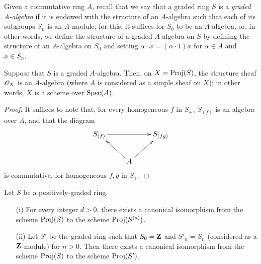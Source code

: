 \begin{env}[2.4.5]
\label{II.2.4.5}
Given a commutative ring $A$, recall that we say that a graded ring $S$ is a \emph{graded $A$-algebra} if it is endowed with the structure of an $A$-algebra such that each of its subgroups $S_n$ is an $A$-module;
for this, it suffices for $S_0$ to be
an $A$-algebra, or, in other words, we define the structure of a graded $A$-algebra on $S$ by defining the structure of an $A$-algebra on $S_0$ and setting $\alpha\cdot x=(\alpha\cdot1)x$ for $\alpha\in A$ and $x\in S_n$.
\end{env}

\begin{proposition}[2.4.6]
\label{II.2.4.6}
Suppose that $S$ is a graded $A$-algebra.
Then, on $X=\operatorname{Proj}(S)$, the structure sheaf $\mathscr{O}_X$ is an $A$-algebra (where $A$ is considered as a simple sheaf on $X$);
in other words, $X$ is a scheme over $\operatorname{Spec}(A)$.
\end{proposition}

\begin{proof}
It suffices to note that, for every homogeneous $f$ in $S_+$, $S_{(f)}$ is an algebra over $A$, and that the diagram
\[
  \xymatrix{
    S_{(f)} \ar[rr] && S_{(fg)}
  \\ & A \ar[ul] \ar[ur] &
  }
\]
is commutative, for homogeneous $f,g$ in $S_+$.
\end{proof}

\begin{proposition}[2.4.7]
\label{II.2.4.7}
Let $S$ be a positively-graded ring.
\begin{enumerate}
  \item[{\rm(i)}] For every integer $d>0$, there exists a canonical isomorphism from the scheme $\operatorname{Proj}(S)$ to the scheme $\operatorname{Proj}(S^{(d)})$.
  \item[{\rm(ii)}] Let $S'$ be the graded ring such that $S_0=\mathbf{Z}$ and $S'_n=S_n$ (considered as a $\mathbf{Z}$-module) for $n>0$.
    Then there exists a canonical isomorphism from the scheme $\operatorname{Proj}(S)$ to the scheme $\operatorname{Proj}(S')$.
\end{enumerate}
\end{proposition}

